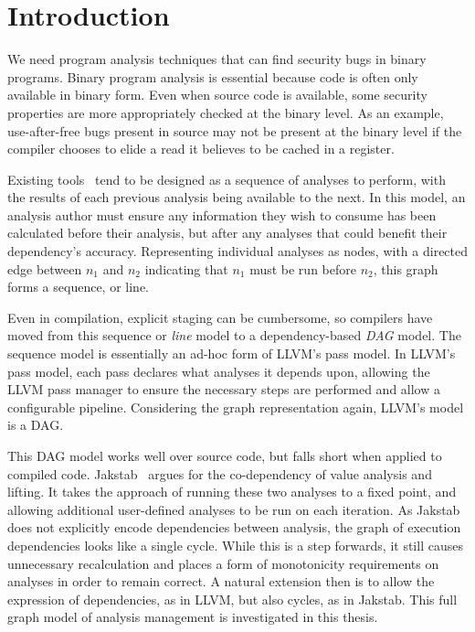 \chapter{Introduction}
We need program analysis techniques that can find security bugs in binary programs.
Binary program analysis is essential because code is often only available in binary form.
Even when source code is available, some security properties are more appropriately checked at the binary level.
As an example, use-after-free bugs present in source may not be present at the binary level if the compiler chooses to elide a read it believes to be cached in a register.

Existing tools~\cite{ida, bap, bitblaze, bindead} tend to be designed as a sequence of analyses to perform, with the results of each previous analysis being available to the next.
In this model, an analysis author must ensure any information they wish to consume has been calculated before their analysis, but after any analyses that could benefit their dependency's accuracy.
Representing individual analyses as nodes, with a directed edge between $n_1$ and $n_2$ indicating that $n_1$ must be run before $n_2$, this graph forms a sequence, or line.

Even in compilation, explicit staging can be cumbersome, so compilers have moved from this sequence or \emph{line} model to a dependency-based \emph{DAG} model.
The sequence model is essentially an ad-hoc form of LLVM\cite{llvm}'s pass model.
In LLVM's pass model, each pass declares what analyses it depends upon, allowing the LLVM pass manager to ensure the necessary steps are performed and allow a configurable pipeline.
Considering the graph representation again, LLVM's model is a DAG.

This DAG model works well over source code, but falls short when applied to compiled code.
Jakstab~\cite{jakstab} argues for the co-dependency of value analysis and lifting. 
It takes the approach of running these two analyses to a fixed point, and allowing additional user-defined analyses to be run on each iteration.
As Jakstab does not explicitly encode dependencies between analysis, the graph of execution dependencies looks like a single cycle.
While this is a step forwards, it still causes unnecessary recalculation and places a form of monotonicity requirements on analyses in order to remain correct.
A natural extension then is to allow the expression of dependencies, as in LLVM, but also cycles, as in Jakstab.
This full graph model of analysis management is investigated in this thesis.

